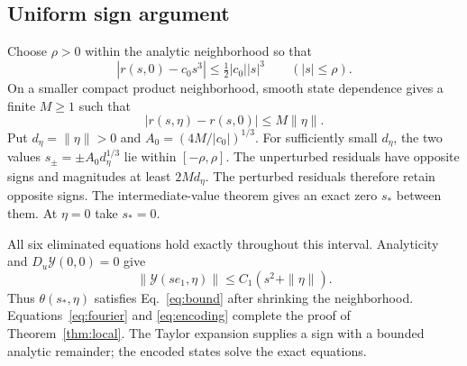 \documentclass[11pt]{article}
\begin{document}
\subsection{Uniform sign argument}
Choose $\rho>0$ within the analytic neighborhood so that
\begin{equation}
|r(s,0)-c_0s^3|\le\tfrac12|c_0||s|^3\qquad (|s|\le\rho).
\end{equation}
On a smaller compact product neighborhood, smooth state dependence gives a finite $M\ge1$ such that
\begin{equation}
|r(s,\eta)-r(s,0)|\le M\|\eta\|.
\end{equation}
Put $d_\eta=\|\eta\|>0$ and $A_0=(4M/|c_0|)^{1/3}$. For sufficiently small $d_\eta$, the two values $s_\pm=\pm A_0d_\eta^{1/3}$ lie within $[-\rho,\rho]$. The unperturbed residuals have opposite signs and magnitudes at least $2Md_\eta$. The perturbed residuals therefore retain opposite signs. The intermediate-value theorem gives an exact zero $s_*$ between them. At $\eta=0$ take $s_*=0$.

All six eliminated equations hold exactly throughout this interval. Analyticity and $D_u\mathcal Y(0,0)=0$ give
\begin{equation}
\|\mathcal Y(se_1,\eta)\|\le C_1(s^2+\|\eta\|).
\end{equation}
Thus $\theta(s_*,\eta)$ satisfies Eq.~\eqref{eq:bound} after shrinking the neighborhood. Equations~\eqref{eq:fourier} and \eqref{eq:encoding} complete the proof of Theorem~\ref{thm:local}. The Taylor expansion supplies a sign with a bounded analytic remainder; the encoded states solve the exact equations.
\end{document}
